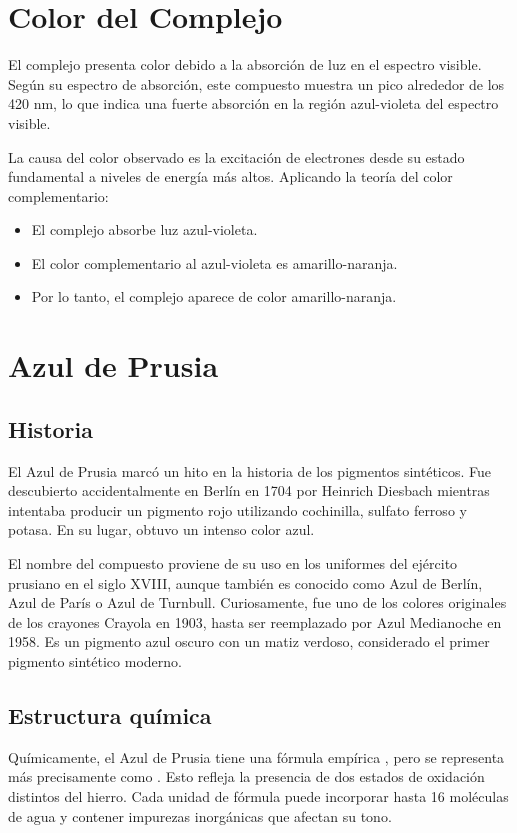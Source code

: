 \documentclass[a4paper,12pt]{article}
\begin{document}
\section*{Color del Complejo }
El complejo  presenta color debido a la absorción de luz en el espectro visible. Según su espectro de absorción, este compuesto muestra un pico alrededor de los 420 nm, lo que indica una fuerte absorción en la región azul-violeta del espectro visible.

La causa del color observado es la excitación de electrones desde su estado fundamental a niveles de energía más altos. Aplicando la teoría del color complementario:
\begin{itemize}
    \item El complejo absorbe luz azul-violeta.
    \item El color complementario al azul-violeta es amarillo-naranja.
    \item Por lo tanto, el complejo aparece de color amarillo-naranja.
\end{itemize}
\section*{Azul de Prusia}

\subsection*{Historia}
El Azul de Prusia marcó un hito en la historia de los pigmentos sintéticos. Fue descubierto accidentalmente en Berlín en 1704 por Heinrich Diesbach mientras intentaba producir un pigmento rojo utilizando cochinilla, sulfato ferroso y potasa. En su lugar, obtuvo un intenso color azul.

El nombre del compuesto proviene de su uso en los uniformes del ejército prusiano en el siglo XVIII, aunque también es conocido como Azul de Berlín, Azul de París o Azul de Turnbull. Curiosamente, fue uno de los colores originales de los crayones Crayola en 1903, hasta ser reemplazado por Azul Medianoche en 1958. Es un pigmento azul oscuro con un matiz verdoso, considerado el primer pigmento sintético moderno.

\subsection*{Estructura química}
Químicamente, el Azul de Prusia tiene una fórmula empírica , pero se representa más precisamente como . Esto refleja la presencia de dos estados de oxidación distintos del hierro. Cada unidad de fórmula puede incorporar hasta 16 moléculas de agua y contener impurezas inorgánicas que afectan su tono.
\end{document}

